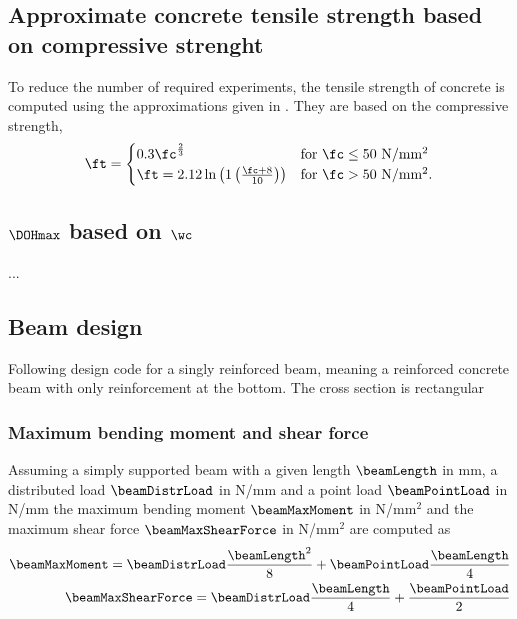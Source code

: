 \subsection{Approximate concrete tensile strength based on compressive strenght}
To reduce the number of required experiments, the tensile strength of concrete is computed using the approximations given in \citeauthor{DIN1992-1-1}.
They are based on the compressive strength, 
\begin{align}
\ft = 
\begin{cases}
0.3 \fc^{\frac{2}{3}}  & \text{for $\fc \le 50$ N/mm$^2$}\\
\ft =2.12 \ln \left( 1 \left( \frac{\fc + 8}{10}\right) \right)& \text{for $\fc > 50$ N/mm$^2$}  \label{eq:tensilstrength}.
\end{cases}
\end{align}
\subsection{$\DOHmax$ based on $\wc$}
...
\subsection{Beam design}
Following design code for a singly reinforced beam, meaning a reinforced concrete beam with only reinforcement at the bottom.
The cross section is rectangular

\subsubsection{Maximum bending moment and shear force}
Assuming a simply supported beam with a given length $\beamLength$ in mm, a distributed load $\beamDistrLoad$ in N/mm and a point load $\beamPointLoad$ in N/mm
the maximum bending moment $\beamMaxMoment$ in N/mm$^2$ and the maximum shear force $\beamMaxShearForce$ in N/mm$^2$ are computed as
\begin{align}
	\beamMaxMoment= \beamDistrLoad \frac{\beamLength^2}{8} + \beamPointLoad \frac{\beamLength}{4}\\
	\beamMaxShearForce = \beamDistrLoad \frac{\beamLength}{4} + \frac{\beamPointLoad}{2}
\end{align}
